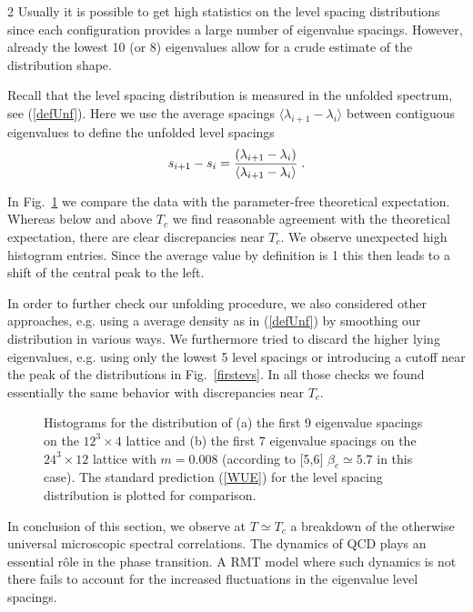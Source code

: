 \begin{multicols}{2}
Usually it is  possible to get high statistics on the level spacing
distributions since each  configuration provides a large number of eigenvalue
spacings. However, already the lowest 10 (or 8) eigenvalues allow for a crude
estimate of the  distribution shape. 

Recall that the level spacing distribution is measured in the unfolded
spectrum, see (\ref{defUnf}). Here we use the average spacings $\langle
\lambda_{i+1}-\lambda_i\rangle$ between contiguous eigenvalues to define the
unfolded level spacings 
\begin{equation}
s_{i+1}-s_i={(\lambda_{i+1}-\lambda_i)\over 
\langle \lambda_{i+1}-\lambda_i\rangle }\; .
\label{UnfSpace}
\end{equation}

In Fig.~\ref{levelspc} we compare the data with the parameter-free
theoretical expectation. Whereas below and above $T_c$ we find reasonable
agreement with the theoretical expectation, there are clear discrepancies near
$T_c$. We observe  unexpected high histogram entries. Since the average value
by definition is 1 this then leads to a shift of the central peak to the left.

In order to further check our unfolding procedure, we also considered
other approaches, e.g. using a average density as in (\ref{defUnf}) by
smoothing our distribution in various ways. We furthermore tried to
discard the higher lying eigenvalues, e.g. using only the lowest  5 level
spacings or introducing a cutoff near the peak of the distributions in
Fig.~\ref{firstevs}.  In all those checks we found essentially the same
behavior with discrepancies near $T_c$.

\begin{figure}[h]
\centerline{}
\centerline{}
\caption{Histograms for the distribution of (a) the first 9  eigenvalue
spacings on the $12^3\times 4$ lattice and (b) the first 7 eigenvalue spacings
on the $24^3\times 12$  lattice  with $m=0.008$ (according to [5,6] $\beta_c
\simeq 5.7$ in this case). The standard prediction (\ref{WUE}) for the  level
spacing distribution is plotted for comparison.}
\label{levelspc}
\end{figure}

In conclusion of this section, we observe at $T\simeq T_c$  a breakdown of the
otherwise universal microscopic spectral correlations. The dynamics of QCD
plays an essential r\^ole in the phase transition. A RMT model where such
dynamics is not there fails to account for the increased  fluctuations in the
eigenvalue level spacings.



\end{multicols}
